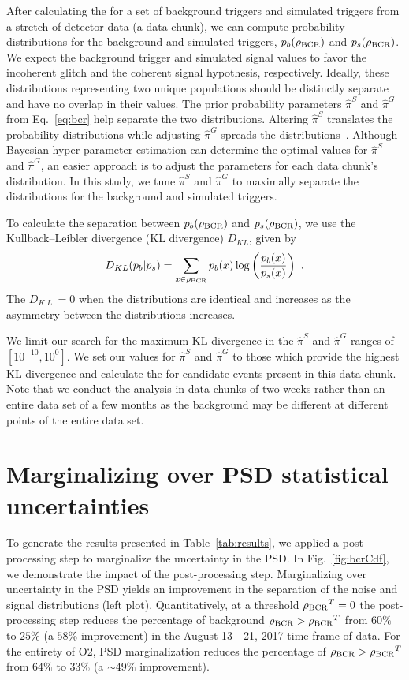 \documentclass[useAMS,fleqn, usenatbib, final]{mnras}
\begin{document}
After calculating the \bcr for a set of background triggers and simulated triggers from a stretch of detector-data (a data chunk), we can compute probability distributions for the background and simulated triggers, $p_b(\bcr)$ and $p_s(\bcr)$. We expect the background trigger and simulated signal \bcr values to favor the incoherent glitch and the coherent signal hypothesis, respectively. Ideally, these distributions representing two unique populations should be distinctly separate and have no overlap in their \bcr values. The prior probability parameters $\hat{\pi}^S$ and $\hat{\pi}^G$ from Eq.~\ref{eq:bcr} help separate the two distributions. Altering $\hat{\pi}^S$ translates the \bcr probability distributions while adjusting $\hat{\pi}^G$ spreads the distributions~\citep[see][Appendix A]{BCR1}. Although Bayesian hyper-parameter estimation can determine the optimal values for $\hat{\pi}^S$ and $\hat{\pi}^G$, an easier approach is to adjust the parameters for each data chunk's \bcr distribution. In this study, we tune $\hat{\pi}^S$ and $\hat{\pi}^G$ to maximally separate the \bcr distributions for the background and simulated triggers. 

To calculate the separation between $p_b(\bcr)$ and $p_s(\bcr)$, we use the Kullback--Leibler divergence (KL divergence) $D_{KL}$, given by
\begin{equation}
    D_{KL}(p_b | p_s) = \sum\limits_{x\in \bcr} p_b(x) \log \left( \frac{p_b(x)}{p_s(x)} \right)  \ .
\end{equation}
The $D_{K.L.}=0$ when the distributions are identical and increases as the asymmetry between the distributions increases. 

We limit our search for the maximum KL-divergence in the $\hat{\pi}^S$ and $\hat{\pi}^G$ ranges of $[10^{-10}, 10^0]$. We set our values for $\hat{\pi}^S$ and $\hat{\pi}^G$ to those which provide the highest KL-divergence and calculate the \bcr for candidate events present in this data chunk. Note that we conduct the analysis in data chunks of two weeks rather than an entire data set of a few months as the background may be different at different points of the entire data set.



\section{Marginalizing over PSD statistical uncertainties}\label{sec:psd-marginalization}
To generate the results presented in Table~\ref{tab:results}, we applied a post-processing step to marginalize the uncertainty in the PSD. In Fig.~\ref{fig:bcrCdf}, we demonstrate the impact of the post-processing step. Marginalizing over uncertainty in the PSD yields an improvement in the separation of the noise and signal distributions (left plot). Quantitatively, at a threshold $\bcr^T=0$ the post-processing step reduces the percentage of background $\bcr > \bcr^T$ from $60\%$ to $25\%$ (a $58\%$ improvement) in the August 13 - 21, 2017 time-frame of data. For the entirety of O2, PSD marginalization reduces the percentage of $\bcr > \bcr^T$ from $64\%$ to $33\%$ (a $\sim49\%$ improvement). 
\end{document}
